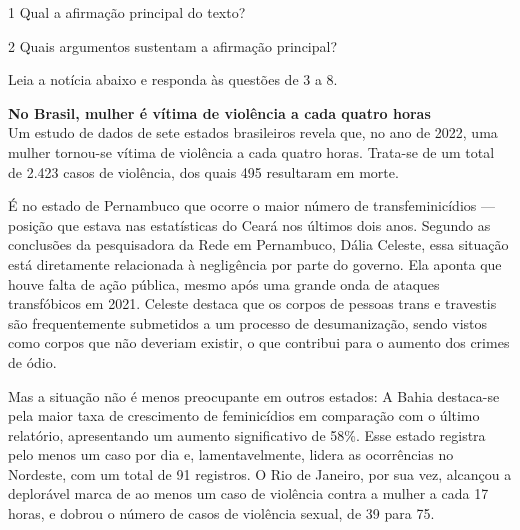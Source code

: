 \num{1} Qual a afirmação principal do texto?


\num{2} Quais argumentos sustentam a afirmação principal?

 
\pagebreak

Leia a notícia abaixo e responda às questões de 3 a 8.

\begin{myquote}

\textbf{No Brasil, mulher é vítima de violência a cada quatro horas} \\

Um estudo de dados de sete estados brasileiros revela que, no ano de
2022, uma mulher tornou-se vítima de violência a cada quatro horas. Trata-se de 
um total de 2.423 casos de violência, dos quais 495 resultaram em morte.

É no estado de Pernambuco que ocorre o maior número de transfeminicídios ---
posição que estava nas estatísticas do Ceará nos últimos dois anos. Segundo
as conclusões da pesquisadora da Rede em Pernambuco, Dália Celeste, essa 
situação está diretamente relacionada à negligência por parte do governo. Ela 
aponta que houve falta de ação pública, mesmo
após uma grande onda de ataques transfóbicos em 2021. Celeste
destaca que os corpos de pessoas trans e travestis são frequentemente
submetidos a um processo de desumanização, sendo vistos como corpos que não
deveriam existir, o que contribui para o aumento dos crimes de ódio.

Mas a situação não é menos preocupante em outros estados: A Bahia destaca-se 
pela maior taxa de crescimento de feminicídios em comparação com o último relatório, 
apresentando um aumento significativo de 58\%. Esse estado registra pelo 
menos um caso por dia e, lamentavelmente, lidera as ocorrências no Nordeste, 
com um total de 91 registros. O Rio de Janeiro, por sua vez, alcançou a deplorável marca de
ao menos um caso de violência contra a mulher a cada 17 horas, e dobrou 
o número de casos de violência sexual, de 39 para 75.


\end{myquote}


